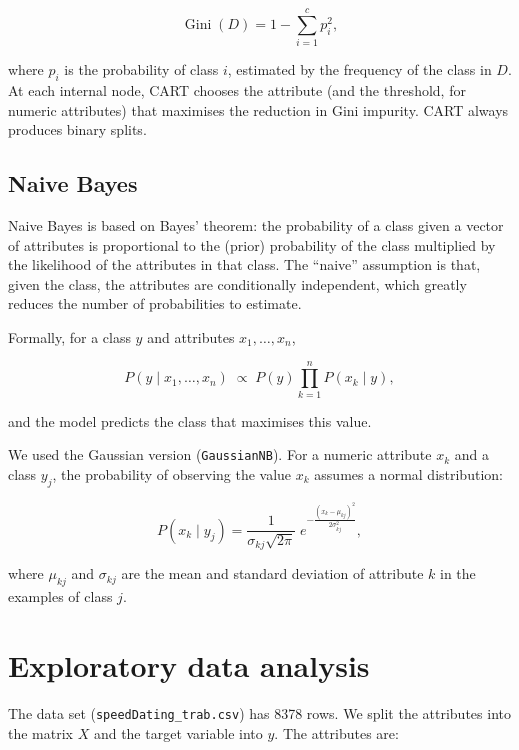 \documentclass[12pt,a4paper]{article}
\newcommand{\code}[1]{\texttt{#1}}
\begin{document}
\[
  \operatorname{Gini}(D) = 1 - \sum_{i=1}^{c} p_i^{2},
\]

where $p_i$ is the probability of class $i$, estimated by the frequency of the class in $D$. At each internal node, CART chooses the attribute (and the threshold, for numeric attributes) that maximises the reduction in Gini impurity. CART always produces binary splits.

\subsection{Naive Bayes}

Naive Bayes is based on Bayes' theorem: the probability of a class given a vector of attributes is proportional to the (prior) probability of the class multiplied by the likelihood of the attributes in that class. The ``naive'' assumption is that, given the class, the attributes are conditionally independent, which greatly reduces the number of probabilities to estimate.

Formally, for a class $y$ and attributes $x_1,\dots,x_n$,

\[
  P(y \mid x_1,\dots,x_n) \;\propto\; P(y)\prod_{k=1}^{n} P(x_k \mid y),
\]

and the model predicts the class that maximises this value.

We used the Gaussian version (\code{GaussianNB}). For a numeric attribute $x_k$ and a class $y_j$, the probability of observing the value $x_k$ assumes a normal distribution:

\[
  P(x_k \mid y_j) = \frac{1}{\sigma_{kj}\sqrt{2\pi}}\; e^{-\frac{(x_k-\mu_{kj})^2}{2\sigma_{kj}^2}},
\]

where $\mu_{kj}$ and $\sigma_{kj}$ are the mean and standard deviation of attribute $k$ in the examples of class $j$.

\clearpage
\section{Exploratory data analysis}
\label{sec:dados}

The data set (\code{speedDating\_trab.csv}) has 8378 rows. We split the attributes into the matrix $X$ and the target variable into $y$. The attributes are:
\end{document}
